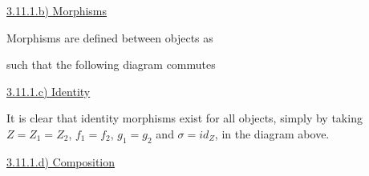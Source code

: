 \documentclass[12pt, letterpaper, twoside]{report}
\begin{document}
\vspace{5mm}
\underline{3.11.1.b) Morphisms}

Morphisms are defined between objects as


such that the following diagram commutes



\vspace{5mm}
\underline{3.11.1.c) Identity}

It is clear that identity morphisms exist for all objects, simply by taking $Z = Z_1 = Z_2$, $f_1 = f_2$, $g_1 = g_2$ and $\sigma = id_Z$, in the diagram above.


\vspace{5mm}
\underline{3.11.1.d) Composition}
\end{document}

